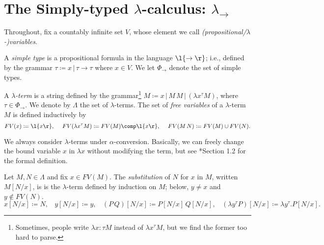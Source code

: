 \documentclass[reqno]{amsart}
\begin{document}
    \section{The Simply-typed $\lambda$-calculus: $\lambda_\rightarrow$}

    Throughout, fix a countably infinite set $V$, whose element we call \textit{(propositional/$\lambda$-)variables}.

    \begin{definition}
        A \textit{simple type} is a propositional formula in the language $\l\{\rightarrow\r\}$; i.e., defined by the grammar $\tau\coloneqq x\,|\,\tau\rightarrow\tau$ where $x\in V$. We let $\Phi_\rightarrow$ denote the set of simple types.
    \end{definition}

    \begin{definition}
        A \textit{$\lambda$-term} is a string defined by the grammar\footnote{Sometimes, people write $\lambda x:\tau M$ instead of $\lambda x^\tau M$, but we find the former too hard to parse.} $M\coloneqq x\,|\,M\,M\,|\,(\lambda x^\tau M)$, where $\tau\in\Phi_\rightarrow$. We denote by $\Lambda$ the set of $\lambda$-terms. The set of \textit{free variables} of a $\lambda$-term $M$ is defined inductively by
        \begin{equation*}
            FV(x)\coloneqq\l\{x\r\},\ \ \ \ FV(\lambda x^\tau M)\coloneqq FV(M)\comp\l\{x\r\},\ \ \ \ FV(M\,N)\coloneqq FV(M)\cup FV(N).
        \end{equation*}
    \end{definition}

    \begin{remark}
        We always consider $\lambda$-terms under $\alpha$-conversion. Basically, we can freely change the bound variable $x$ in $\lambda x$ without modifying the term, but see \cite{SU06}*{Section 1.2} for the formal definition.
    \end{remark}

    \begin{definition}
        Let $M,N\in\Lambda$ and fix $x\in FV(M)$. The \textit{substitution} of $N$ for $x$ in $M$, written $M[N/x]$, is is the $\lambda$-term defined by induction on $M$; below, $y\neq x$ and $y\not\in FV(N)$.
        \begin{equation*}
            x[N/x]\coloneqq N,\ \ \ \ y[N/x]\coloneqq y,\ \ \ \ (P\,Q)[N/x]\coloneqq P[N/x]\,Q[N/x],\ \ \ \ (\lambda y^\tau P)[N/x]\coloneqq\lambda y^\tau.P[N/x].
        \end{equation*}
    \end{definition}
\end{document}
